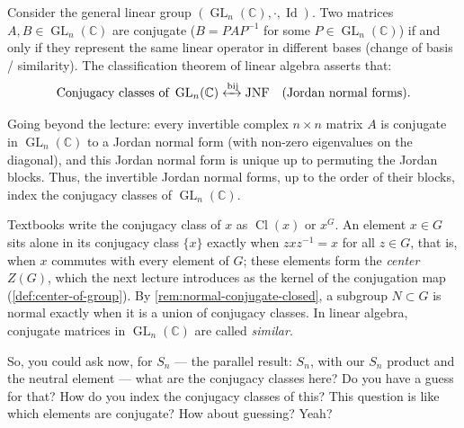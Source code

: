 \begin{content}
Consider the general linear group $(\operatorname{GL}_n(\mathbb{C}), \cdot, \operatorname{Id})$. Two matrices $A, B \in \operatorname{GL}_n(\mathbb{C})$ are conjugate ($B = P A P^{-1}$ for some $P \in \operatorname{GL}_n(\mathbb{C})$) if and only if they represent the same linear operator in different bases (change of basis / similarity). The classification theorem of linear algebra asserts that:
\[
\text{Conjugacy classes of } \operatorname{GL}_n(\mathbb{C}) \xleftrightarrow{\text{bij}} \text{JNF} \quad (\text{Jordan normal forms}).
\]

\begin{steps}
Going beyond the lecture: every invertible complex $n \times n$ matrix $A$ is conjugate in $\operatorname{GL}_n(\mathbb{C})$ to a Jordan normal form (with non-zero eigenvalues on the diagonal), and this Jordan normal form is unique up to permuting the Jordan blocks. Thus, the invertible Jordan normal forms, up to the order of their blocks, index the conjugacy classes of $\operatorname{GL}_n(\mathbb{C})$.
\end{steps}
\end{content}

\begin{aiNote}
Textbooks write the conjugacy class of $x$ as $\operatorname{Cl}(x)$ or $x^G$. An element $x \in G$ sits alone in its conjugacy class $\{x\}$ exactly when $z x z^{-1} = x$ for all $z \in G$, that is, when $x$ commutes with every element of $G$; these elements form the \emph{center} $Z(G)$, which the next lecture introduces as the kernel of the conjugation map (\cref{def:center-of-group}). By \cref{rem:normal-conjugate-closed}, a subgroup $N \subset G$ is normal exactly when it is a union of conjugacy classes. In linear algebra, conjugate matrices in $\operatorname{GL}_n(\mathbb{C})$ are called \emph{similar}.
\end{aiNote}

\begin{speech}[01:19:03 - 01:19:31]
So, you could ask now, for $S_n$ --- the parallel result: $S_n$, with our $S_n$ product and the neutral element  --- what are the conjugacy classes here? Do you have a guess for that? How do you index the conjugacy classes of this? This question is like which elements are conjugate? How about guessing? Yeah?
\end{speech}

